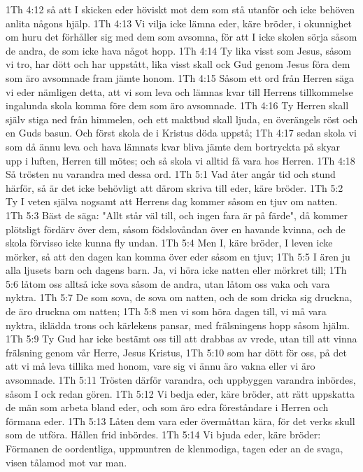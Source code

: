 1Th 4:12  så att I skicken eder höviskt mot dem som stå utanför och icke behöven anlita någons hjälp.
1Th 4:13  Vi vilja icke lämna eder, käre bröder, i okunnighet om huru det förhåller sig med dem som avsomna, för att I icke skolen sörja såsom de andra, de som icke hava något hopp.
1Th 4:14  Ty lika visst som Jesus, såsom vi tro, har dött och har uppstått, lika visst skall ock Gud genom Jesus föra dem som äro avsomnade fram jämte honom.
1Th 4:15  Såsom ett ord från Herren säga vi eder nämligen detta, att vi som leva och lämnas kvar till Herrens tillkommelse ingalunda skola komma före dem som äro avsomnade.
1Th 4:16  Ty Herren skall själv stiga ned från himmelen, och ett maktbud skall ljuda, en överängels röst och en Guds basun. Och först skola de i Kristus döda uppstå;
1Th 4:17  sedan skola vi som då ännu leva och hava lämnats kvar bliva jämte dem bortryckta på skyar upp i luften, Herren till mötes; och så skola vi alltid få vara hos Herren.
1Th 4:18  Så trösten nu varandra med dessa ord.
1Th 5:1  Vad åter angår tid och stund härför, så är det icke behövligt att därom skriva till eder, käre bröder.
1Th 5:2  Ty I veten själva nogsamt att Herrens dag kommer såsom en tjuv om natten.
1Th 5:3  Bäst de säga: "Allt står väl till, och ingen fara är på färde", då kommer plötsligt fördärv över dem, såsom födslovåndan över en havande kvinna, och de skola förvisso icke kunna fly undan.
1Th 5:4  Men I, käre bröder, I leven icke mörker, så att den dagen kan komma över eder såsom en tjuv;
1Th 5:5  I ären ju alla ljusets barn och dagens barn. Ja, vi höra icke natten eller mörkret till;
1Th 5:6  låtom oss alltså icke sova såsom de andra, utan låtom oss vaka och vara nyktra.
1Th 5:7  De som sova, de sova om natten, och de som dricka sig druckna, de äro druckna om natten;
1Th 5:8  men vi som höra dagen till, vi må vara nyktra, iklädda trons och kärlekens pansar, med frälsningens hopp såsom hjälm.
1Th 5:9  Ty Gud har icke bestämt oss till att drabbas av vrede, utan till att vinna frälsning genom vår Herre, Jesus Kristus,
1Th 5:10  som har dött för oss, på det att vi må leva tillika med honom, vare sig vi ännu äro vakna eller vi äro avsomnade.
1Th 5:11  Trösten därför varandra, och uppbyggen varandra inbördes, såsom I ock redan gören.
1Th 5:12  Vi bedja eder, käre bröder, att rätt uppskatta de män som arbeta bland eder, och som äro edra föreståndare i Herren och förmana eder.
1Th 5:13  Låten dem vara eder övermåttan kära, för det verks skull som de utföra. Hållen frid inbördes.
1Th 5:14  Vi bjuda eder, käre bröder: Förmanen de oordentliga, uppmuntren de klenmodiga, tagen eder an de svaga, visen tålamod mot var man.
